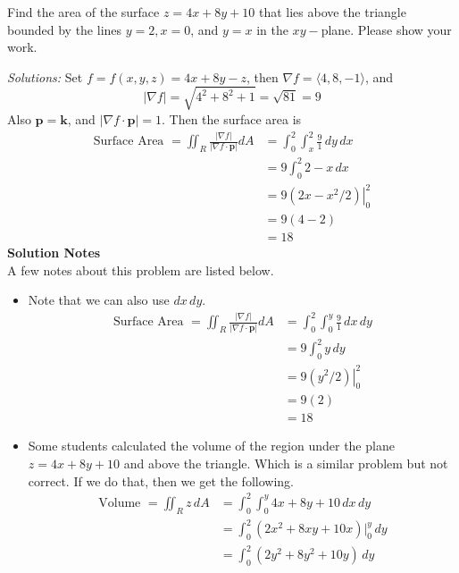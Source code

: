    \fi
    
\fi


\ifnum {}
    \question[4] Find the area of the surface $z = 4x + 8y + 10$ that lies above the triangle bounded by the lines $y = 2, x = 0$, and $y = x$ in the $xy-$plane. Please show your work. 
    
    \ifnum {} {\color{DarkBlue}  \textit{Solutions:} 
    Set $f = f(x,y,z) = 4x + 8y -z$, then $\nabla f = \langle 4,8,-1\rangle$, and 
    $$|\nabla f| = \sqrt{4^2+8^2+ 1 } = \sqrt{81} = 9$$
    Also $\mathbf p = \mathbf k$, and $|\nabla f \cdot \mathbf p| = 1$. Then the surface area is
    \begin{align}
        \text{Surface Area } = \iint_R \frac{|\nabla f|}{|\nabla f \cdot \mathbf p| }dA 
        &= \int_0^2 \int_x^{2} \frac{9}{1} \, dy\,dx \\
        &= 9 \int_0^2 2 - x \,dx \\
        &= 9 \left( \left. 2x - x^2/2 \right) \right|_0^2  \\
        &= 9  ( 4 - 2)  \\
        &= 18
    \end{align}
    \textbf{Solution Notes}\\
    A few notes about this problem are listed below. 
    \begin{itemize}
        \item Note that we can also use $dx\,dy$. 
    \begin{align}
        \text{Surface Area } = \iint_R \frac{|\nabla f|}{|\nabla f \cdot \mathbf p| }dA 
        &= \int_0^2 \int_0^{y} \frac{9}{1} \, dx\,dy \\
        &= 9 \int_0^2 y \,dy \\
        &= 9 \left( \left. y^2/2 \right) \right|_0^2  \\
        &= 9  ( 2)  \\
        &= 18
    \end{align}    
    \item Some students calculated the volume of the region under the plane $z=4x+8y+10$ and above the triangle. Which is a similar problem but not correct. If we do that, then we get the following. 
        \begin{align}
        \text{Volume } = \iint_R z \, dA 
        &= \int_0^2 \int_0^{y} 4x+8y+10 \, dx\,dy \\
        &=  \int_0^2 (2x^2+8xy +10x)|_0^y \,dy \\
        &=  \int_0^2 (2y^2+8y^2 +10y) \,dy \\

\end{align}
\end{itemize}}
